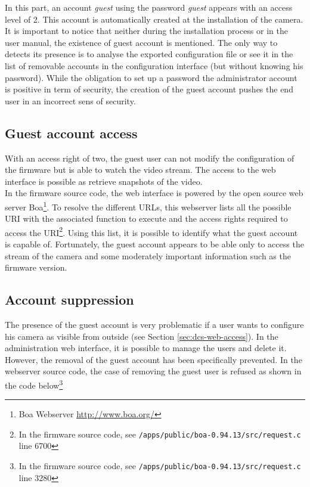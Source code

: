 In this part, an account \emph{guest} using the password \emph{guest} appears with an access level of 2.
This account is automatically created at the installation of the camera.\\

It is important to notice that neither during the installation process or in the user manual, the existence of guest account is mentioned.
The only way to detects its presence is to analyse the exported configuration file or see it in the list of removable accounts in the configuration interface (but without knowing his password).
While the obligation to set up a password the administrator account is positive in term of security, the creation of the guest account pushes the end user in an incorrect sens of security.

\subsection{Guest account access}
\label{sec:dcs-guest-rights}

With an access right of two, the guest user can not modify the configuration of the firmware but is able to watch the video stream.
The access to the web interface is possible as retrieve snapshots of the video.\\

In the firmware source code, the web interface is powered by the open source web server Boa\footnote{Boa Webserver \url{http://www.boa.org/}}.
To resolve the different URLs, this webserver lists all the possible URI with the associated function to execute and the access rights required to access the URI\footnote{In the firmware source code, see \texttt{/apps/public/boa-0.94.13/src/request.c} line 6700}.
Using this list, it is possible to identify what the guest account is capable of.
Fortunately, the guest account appears to be able only to access the stream of the camera and some moderately important information such as the firmware version.

\subsection{Account suppression}
\label{sec:dcs-guest-suppression}

The presence of the guest account is very problematic if a user wants to configure his camera as visible from outside (see Section \ref{sec:dcs-web-access}).
In the administration web interface, it is possible to manage the users and delete it.
However, the removal of the guest account has been specifically prevented.
In the webserver source code, the case of removing the guest user is refused as shown in the code below\footnote{In the firmware source code, see \texttt{/apps/public/boa-0.94.13/src/request.c} line 3280}

